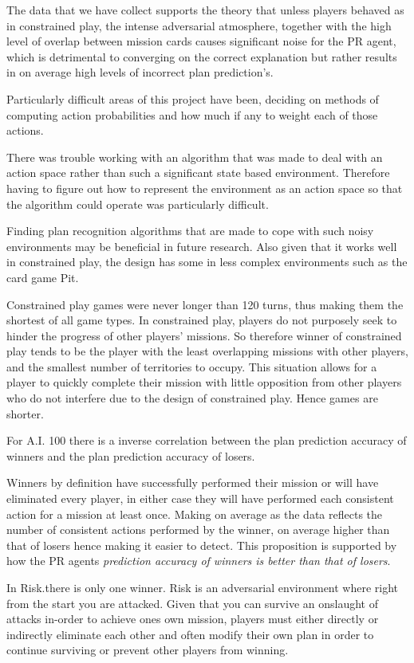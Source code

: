 \documentclass[parskip]{cs4rep}
\begin{document}
The data that we have collect supports the theory that unless players behaved as in constrained play, the intense adversarial atmosphere, together with the high level of overlap between mission cards causes significant noise for the PR agent, which is detrimental to converging on the correct explanation but rather results in on average high levels of incorrect plan prediction's.

Particularly difficult areas of this project have been, deciding on methods of computing action probabilities and how much if any to weight each of those actions. 

There was trouble working with an algorithm that was made to deal with an action space rather than such a significant state based environment. Therefore having to figure out how to represent the environment as an action space so that the algorithm could operate was particularly difficult. 

Finding plan recognition algorithms that are made to cope with such noisy environments may be beneficial in future research. Also given that it works well in constrained play, the design has some in less complex environments such as the card game Pit.

Constrained play games were never longer than 120 turns, thus making them the shortest of all game types. In constrained play, players do not purposely seek to hinder the progress of other players' missions. So therefore winner of constrained play  tends to be the player with the least overlapping missions with other players, and the smallest number of territories to occupy. This situation allows for a player to quickly complete their mission with little opposition from other players who do not interfere due to the design of constrained play. Hence games are shorter.

For A.I. 100 there is a inverse correlation between the plan prediction accuracy of winners and the plan prediction accuracy of losers. 

Winners by definition have successfully performed their mission or will have eliminated every player, in either case they will have performed each consistent action for a mission at least once. Making on average as the data reflects the number of consistent actions performed by the winner, on average higher than that of losers hence making it easier to detect. This proposition is supported by how the PR agents \textit{prediction accuracy of winners is better than that of losers}.

In Risk.there is only one winner. Risk is an adversarial environment where right from the start you are attacked. Given that you can survive an onslaught of attacks in-order to achieve ones own mission, players must either directly or indirectly eliminate each other and often modify their own plan in order to continue surviving or prevent other players from winning. 
\end{document}
